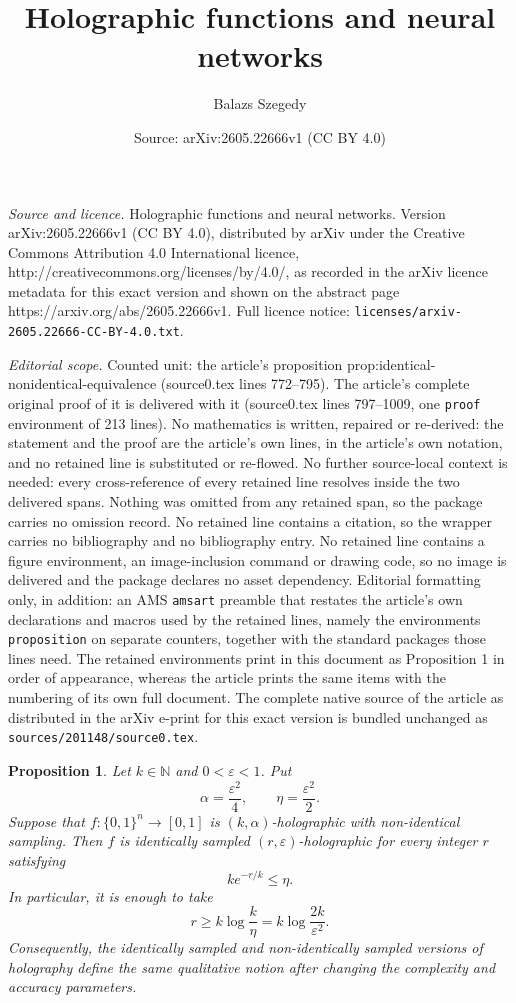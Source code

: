 \documentclass[10pt,a4paper]{amsart}
\title{Holographic functions and neural networks}
\author{Balazs Szegedy}
\date{Source: arXiv:2605.22666v1 (CC BY 4.0)}
\newtheorem{proposition}{Proposition}
\begin{document}
\maketitle

\noindent\emph{Source and licence.} Holographic functions and neural networks. Version arXiv:2605.22666v1 (CC BY 4.0), distributed by arXiv under the Creative Commons Attribution 4.0 International licence, http://creativecommons.org/licenses/by/4.0/, as recorded in the arXiv licence metadata for this exact version and shown on the abstract page https://arxiv.org/abs/2605.22666v1. Full licence notice: \texttt{licenses/arxiv-2605.22666-CC-BY-4.0.txt}.\par\smallskip

\noindent\textit{Editorial scope.} Counted unit: the article's proposition prop:identical-nonidentical-equivalence (source0.tex lines 772--795). The article's complete original proof of it is delivered with it (source0.tex lines 797--1009, one \texttt{proof} environment of 213 lines). No mathematics is written, repaired or re-derived: the statement and the proof are the article's own lines, in the article's own notation, and no retained line is substituted or re-flowed.  No further source-local context is needed: every cross-reference of every retained line resolves inside the two delivered spans.  Nothing was omitted from any retained span, so the package carries no omission record.  No retained line contains a citation, so the wrapper carries no bibliography and no bibliography entry.  No retained line contains a figure environment, an image-inclusion command or drawing code, so no image is delivered and the package declares no asset dependency.  Editorial formatting only, in addition: an AMS \texttt{amsart} preamble that restates the article's own declarations and macros used by the retained lines, namely the environments \texttt{proposition} on separate counters, together with the standard packages those lines need.  The retained environments print in this document as Proposition 1 in order of appearance, whereas the article prints the same items with the numbering of its own full document.  The complete native source of the article as distributed in the arXiv e-print for this exact version is bundled unchanged as \texttt{sources/201148/source0.tex}.
\begin{proposition}\label{prop:identical-nonidentical-equivalence}
Let \(k\in\mathbb N\) and \(0<\varepsilon<1\).  Put
\[
        \alpha=\frac{\varepsilon^2}{4},
        \qquad
        \eta=\frac{\varepsilon^2}{2}.
\]
Suppose that \(f:\{0,1\}^n\to[0,1]\) is
\((k,\alpha)\)-holographic with non-identical sampling.  Then \(f\) is
identically sampled \((r,\varepsilon)\)-holographic for every integer
\(r\) satisfying
\[
        k e^{-r/k}\leq \eta .
\]
In particular, it is enough to take
\[
        r\geq k\log\frac{k}{\eta}
        =
        k\log\frac{2k}{\varepsilon^2}.
\]
Consequently, the identically sampled and non-identically sampled versions of
holography define the same qualitative notion after changing the complexity
and accuracy parameters.
\end{proposition}
\end{document}
